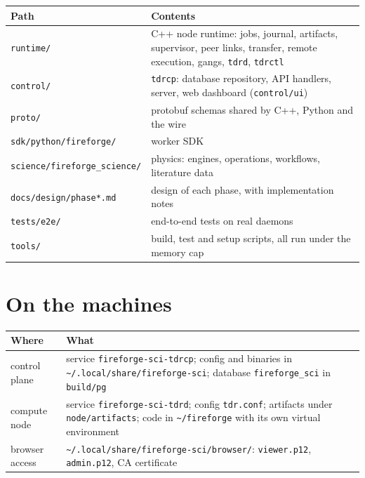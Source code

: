 \documentclass[11pt,a4paper]{report}
\newcommand{\code}[1]{\texttt{#1}}
\begin{document}
\begin{center}
\small
\begin{tabularx}{\linewidth}{@{}lX@{}}
\toprule
Path & Contents \\
\midrule
\code{runtime/} & C++ node runtime: jobs, journal, artifacts, supervisor, peer links, transfer, remote execution, gangs, \code{tdrd}, \code{tdrctl} \\
\code{control/} & \code{tdrcp}: database repository, API handlers, server, web dashboard (\code{control/ui}) \\
\code{proto/} & protobuf schemas shared by C++, Python and the wire \\
\code{sdk/python/fireforge/} & worker SDK \\
\code{science/fireforge\_science/} & physics: engines, operations, workflows, literature data \\
\code{docs/design/phase*.md} & design of each phase, with implementation notes \\
\code{tests/e2e/} & end-to-end tests on real daemons \\
\code{tools/} & build, test and setup scripts, all run under the memory cap \\
\bottomrule
\end{tabularx}
\end{center}

\section{On the machines}

\begin{center}
\small
\begin{tabularx}{\linewidth}{@{}lX@{}}
\toprule
Where & What \\
\midrule
control plane & service \code{fireforge-sci-tdrcp}; config and binaries in \code{\textasciitilde/.local/share/fireforge-sci}; database \code{fireforge\_sci} in \code{build/pg} \\
compute node & service \code{fireforge-sci-tdrd}; config \code{tdr.conf}; artifacts under \code{node/artifacts}; code in \code{\textasciitilde/fireforge} with its own virtual environment \\
browser access & \code{\textasciitilde/.local/share/fireforge-sci/browser/}: \code{viewer.p12}, \code{admin.p12}, CA certificate \\
\bottomrule
\end{tabularx}
\end{center}
\end{document}
